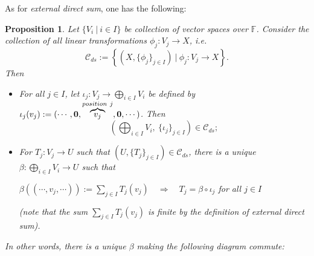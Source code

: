 \documentclass[11pt,openany]{book}
\theoremstyle{plain}
\newtheorem{proposition}[proposition]{Proposition}
\theoremstyle{definition}
\theoremstyle{remark}
\begin{document}
As for {\it external direct sum}, one has the following:
\begin{proposition}
    Let $\{V_i\ |\ i \in I\}$ be collection of vector spaces over $\mathbb{F}$. Consider the collection of all linear transformations $\phi_j: V_j \to X$, i.e.
    $$\mathcal{C}_{ds} := \left\{(X, \{\phi_j\}_{j \in I})\ |\ \phi_j : V_j \to X \right\}.$$
    Then
    \begin{itemize}
        \item[(a)] For all $j \in I$, let $\iota_j: V_j \to \bigoplus_{i \in I} V_i$ be defined by $\iota_j(v_j) := (\cdots, {\bf 0}, \overbrace{v_j}^{position\ j}, {\bf 0}, \cdots)$. Then
        $$\left(\bigoplus_{i \in I} V_i,\ \{\iota_j\}_{j \in I} \right) \in \mathcal{C}_{ds};$$
        \item[(b)] For $T_j: V_j \to U$ such that $(U, \{T_j\}_{j \in I}) \in \mathcal{C}_{ds}$, there is a unique $\beta: \bigoplus_{i \in I} V_i \to U$ such that 
        \begin{center}
        $\beta((\cdots, v_j, \cdots)) := \sum_{j \in I} T_j(v_j) \quad \Rightarrow \quad T_j = \beta \circ \iota_j$ for all $j \in I$
        \end{center}
        (note that the sum $\sum_{j \in I} T_j(v_j)$ is finite by the definition of external direct sum).
    \end{itemize}
In other words, there is a unique $\beta$ making the following diagram commute:
\begin{center}
\end{center}
\end{proposition}
\end{document}
